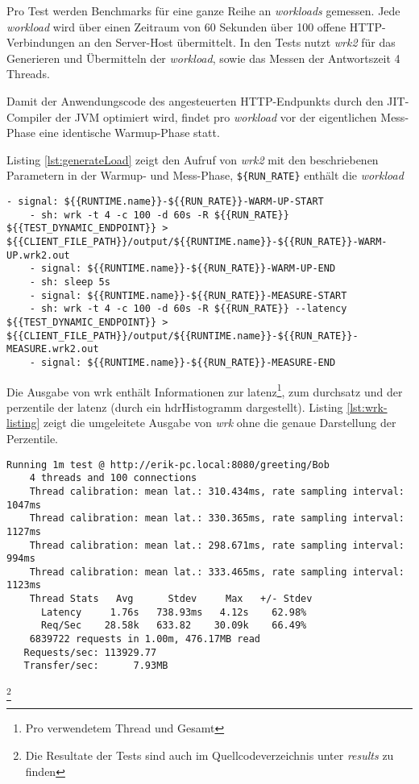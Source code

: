 Pro Test werden Benchmarks für eine ganze Reihe an \textit{workloads} gemessen.
Jede \textit{workload} wird über einen Zeitraum von 60 Sekunden über 100 offene HTTP-Verbindungen an den Server-Host übermittelt.
In den Tests nutzt \textit{wrk2} für das Generieren und Übermitteln der \textit{workload}, sowie das Messen der Antwortszeit
4 Threads.

Damit der Anwendungscode des angesteuerten HTTP-Endpunkts durch den JIT-Compiler der JVM optimiert wird,
findet pro \textit{workload} vor der eigentlichen Mess-Phase eine identische Warmup-Phase statt.

Listing \ref*{lst:generateLoad} zeigt den Aufruf von \textit{wrk2} mit den beschriebenen Parametern in der Warmup- und Mess-Phase,
\verb|${RUN_RATE}| enthält die \textit{workload}

\begin{lstlisting}[caption=Auszug des qDup Skripts generate load, captionpos=b, label=lst:generateLoad]
    - signal: ${{RUNTIME.name}}-${{RUN_RATE}}-WARM-UP-START
    - sh: wrk -t 4 -c 100 -d 60s -R ${{RUN_RATE}} ${{TEST_DYNAMIC_ENDPOINT}} > ${{CLIENT_FILE_PATH}}/output/${{RUNTIME.name}}-${{RUN_RATE}}-WARM-UP.wrk2.out
    - signal: ${{RUNTIME.name}}-${{RUN_RATE}}-WARM-UP-END
    - sh: sleep 5s
    - signal: ${{RUNTIME.name}}-${{RUN_RATE}}-MEASURE-START
    - sh: wrk -t 4 -c 100 -d 60s -R ${{RUN_RATE}} --latency ${{TEST_DYNAMIC_ENDPOINT}} > ${{CLIENT_FILE_PATH}}/output/${{RUNTIME.name}}-${{RUN_RATE}}-MEASURE.wrk2.out
    - signal: ${{RUNTIME.name}}-${{RUN_RATE}}-MEASURE-END
   \end{lstlisting}

Die Ausgabe von wrk enthält Informationen zur \Gls{latenz}\footnote{Pro verwendetem Thread und Gesamt},
zum \Gls{durchsatz} und der \Gls{perzentile} der \Gls{latenz} (durch ein \Gls{hdrHistogramm} dargestellt).
Listing \ref*{lst:wrk-listing} zeigt die umgeleitete Ausgabe von \textit{wrk} ohne die genaue Darstellung der Perzentile.

\begin{lstlisting}[caption=Beispiel für Ausgabe von wrk,captionpos=b, label=lst:wrk-listing]
    Running 1m test @ http://erik-pc.local:8080/greeting/Bob
    4 threads and 100 connections
    Thread calibration: mean lat.: 310.434ms, rate sampling interval: 1047ms
    Thread calibration: mean lat.: 330.365ms, rate sampling interval: 1127ms
    Thread calibration: mean lat.: 298.671ms, rate sampling interval: 994ms
    Thread calibration: mean lat.: 333.465ms, rate sampling interval: 1123ms
    Thread Stats   Avg      Stdev     Max   +/- Stdev
      Latency     1.76s   738.93ms   4.12s    62.98%
      Req/Sec    28.58k   633.82    30.09k    66.49%
    6839722 requests in 1.00m, 476.17MB read
   Requests/sec: 113929.77
   Transfer/sec:      7.93MB
   \end{lstlisting}\footnote{Die Resultate der Tests sind auch im Quellcodeverzeichnis unter \textit{\/results} zu finden}


